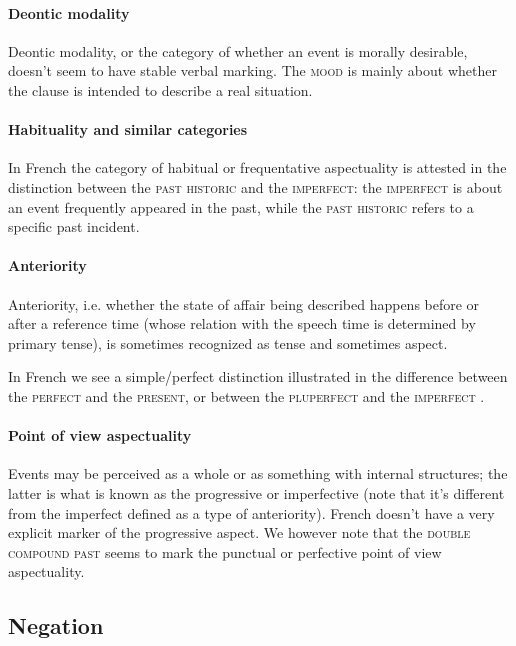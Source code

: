 \documentclass[a4paper, oneside, 12pt]{report}
\newcommand*{\citepage}[1]{p.~{#1}}
\newcommand*{\category}[1]{\textsc{#1}}
\begin{document}
\paragraph*{Deontic modality}
Deontic modality, or the category of whether an event is morally desirable,
doesn't seem to have stable verbal marking.
The \category{mood} is mainly about whether the clause is intended to describe a real situation.

\paragraph*{Habituality and similar categories}
In French the category of habitual or frequentative aspectuality is attested
in the distinction between the \category{past historic} and the \category{imperfect}:
the \category{imperfect} is about an event frequently appeared in the past,
while the \category{past historic} refers to a specific past incident.

\paragraph*{Anteriority}
Anteriority, i.e. whether the state of affair being described
happens before or after a reference time 
(whose relation with the speech time is determined by primary tense),
is sometimes recognized as tense and sometimes aspect.

In French we see a simple/perfect distinction illustrated
in the difference between the \category{perfect} and the \category{present},
or between the \category{pluperfect} and the \category{imperfect}
\citep[\citepage{148}]{l1999advanced}.

\paragraph*{Point of view aspectuality}
Events may be perceived as a whole or as something with internal structures;
the latter is what is known as the progressive or imperfective
(note that it's different from the imperfect defined as a type of anteriority).
French doesn't have a very explicit marker of the progressive aspect.
We however note that the \category{double compound past} \citep[\citepage{152}]{l1999advanced}
seems to mark the punctual or perfective point of view aspectuality.

\subsection{Negation}
\end{document}
